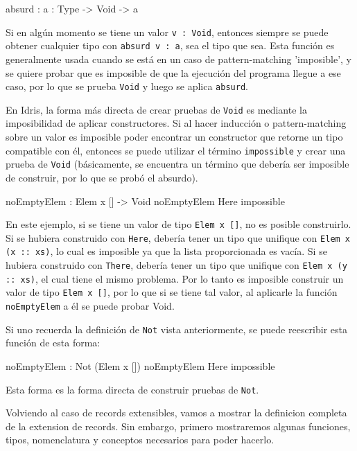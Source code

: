 \begin{code}
absurd : {a : Type} -> Void -> a
\end{code}

Si en algún momento se tiene un valor \texttt{v : Void}, entonces siempre se puede obtener cualquier tipo con \texttt{absurd v : a}, sea el tipo que sea. Esta función es generalmente usada cuando se está en un caso de pattern-matching 'imposible', y se quiere probar que es imposible de que la ejecución del programa llegue a ese caso, por lo que se prueba \texttt{Void} y luego se aplica \texttt{absurd}.

En Idris, la forma más directa de crear pruebas de \texttt{Void} es mediante la imposibilidad de aplicar constructores. Si al hacer inducción o pattern-matching sobre un valor es imposible poder encontrar un constructor que retorne un tipo compatible con él, entonces se puede utilizar el término \texttt{impossible} y crear una prueba de \texttt{Void} (básicamente, se encuentra un término que debería ser imposible de construir, por lo que se probó el absurdo). 

\begin{code}
noEmptyElem : Elem x [] -> Void
noEmptyElem Here impossible
\end{code}

En este ejemplo, si se tiene un valor de tipo \texttt{Elem x []}, no es posible construirlo. Si se hubiera construido con \texttt{Here}, debería tener un tipo que unifique con \texttt{Elem x (x :: xs)}, lo cual es imposible ya que la lista proporcionada es vacía. Si se hubiera construido con \texttt{There}, debería tener un tipo que unifique con \texttt{Elem x (y :: xs)}, el cual tiene el mismo problema. Por lo tanto es imposible construir un valor de tipo \texttt{Elem x []}, por lo que si se tiene tal valor, al aplicarle la función \texttt{noEmptyElem} a él se puede probar Void.

Si uno recuerda la definición de \texttt{Not} vista anteriormente, se puede reescribir esta función de esta forma:

\begin{code}
noEmptyElem : Not (Elem x [])
noEmptyElem Here impossible
\end{code}

Esta forma es la forma directa de construir pruebas de \texttt{Not}.

Volviendo al caso de records extensibles, vamos a mostrar la definicion completa de la extension de records. Sin embargo, primero mostraremos algunas funciones, tipos, nomenclatura y conceptos necesarios para poder hacerlo.


